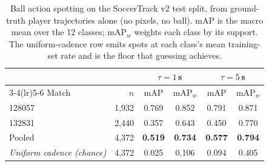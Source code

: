 \begin{table}[t]
  \centering
  \caption{Ball action spotting on the SoccerTrack v2 test split, from ground-truth player trajectories alone (no pixels, no ball). $\text{mAP}$ is the macro mean over the 12 classes; $\text{mAP}_w$ weights each class by its support. The uniform-cadence row emits spots at each class's mean training-set rate and is the floor that guessing achieves.}
  \label{tab:bas_results}
  \small
  \begin{tabular}{lrcccc}
    \toprule
    & & \multicolumn{2}{c}{$\tau = 1\,$s} & \multicolumn{2}{c}{$\tau = 5\,$s} \\
    \cmidrule(lr){3-4}\cmidrule(lr){5-6}
    Match & $n$ & mAP & mAP$_w$ & mAP & mAP$_w$ \\
    \midrule
    128057 & 1,932 & 0.769 & 0.852 & 0.791 & 0.871 \\
    132831 & 2,440 & 0.357 & 0.643 & 0.450 & 0.770 \\
    \midrule
    Pooled & 4,372 & \textbf{0.519} & \textbf{0.734} & \textbf{0.577} & \textbf{0.794} \\
    \midrule
    \textit{Uniform cadence (chance)} & 4,372 & 0.025 & 0.106 & 0.094 & 0.405 \\
    \bottomrule
  \end{tabular}
\end{table}
